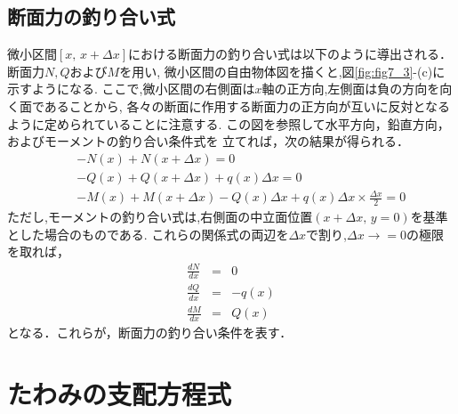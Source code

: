 \documentclass[10pt,a4j]{jarticle}
\begin{document}
\subsection{断面力の釣り合い式}
微小区間$[x,\,x+\Delta x]$における断面力の釣り合い式は以下のように導出される．
断面力$N,Q$および$M$を用い, 微小区間の自由物体図を描くと,図\ref{fig:fig7_3}-(c)に示すようになる.
ここで,微小区間の右側面は$x$軸の正方向,左側面は負の方向を向く面であることから,
各々の断面に作用する断面力の正方向が互いに反対となるように定められていることに注意する.
この図を参照して水平方向，鉛直方向，およびモーメントの釣り合い条件式を
立てれば，次の結果が得られる．
\begin{eqnarray}
	&&-N(x)+N(x+\Delta x) =0 \label{eqn:equib_x} \\
	&&-Q(x)+Q(x+\Delta x)+q(x)\Delta x =0 \label{eqn:equib_y} \\
	&&-M(x)+M(x+\Delta x)-Q(x)\Delta x +q(x)\Delta x \times \frac{\Delta x}{2}=0 \label{eqn:equib_th}
\end{eqnarray}
ただし,モーメントの釣り合い式は,右側面の中立面位置$(x+\Delta x,\, y=0)$を基準とした場合のものである.
これらの関係式の両辺を$\Delta x$で割り,$\Delta x \rightarrow =0$の極限を取れば，
\begin{eqnarray}
	\frac{dN}{dx}&=&0  \label{eqn:equib_N} \\
	\frac{dQ}{dx}&=&-q(x) \label{eqn:equib_Q} \\
	\frac{dM}{dx}&=&Q(x) \label{eqn:equib_M}
\end{eqnarray}
となる．これらが，断面力の釣り合い条件を表す．
\section{たわみの支配方程式}
\end{document}
